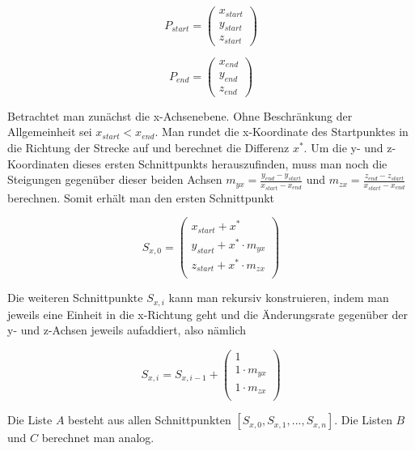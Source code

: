 \documentclass[]{dsadokumentation}
\begin{document}
\begin{equation}
  P_{start} = \begin{pmatrix}x_{start} \\ y_{start} \\ z_{start}\end{pmatrix}
\end{equation}

\begin{equation}
  P_{end} = \begin{pmatrix}x_{end} \\ y_{end} \\ z_{end}\end{pmatrix}
\end{equation}

Betrachtet man zunächst die x-Achsenebene. Ohne Beschränkung der Allgemeinheit sei $x_{start} < x_{end}$. Man rundet die x-Koordinate des Startpunktes in die Richtung der Strecke auf und berechnet die Differenz $x^{\ast}$. Um die y- und z-Koordinaten dieses ersten Schnittpunkts herauszufinden, muss man noch die Steigungen gegenüber dieser beiden Achsen $m_{yx} = \frac{y_{end} - y_{start}}{x_{start} - x_{end}}$ und $m_{zx} = \frac{z_{end} - z_{start}}{x_{start} - x_{end}}$ berechnen. Somit erhält man den ersten Schnittpunkt

\begin{equation}
  S_{x,0} = \begin{pmatrix}
    x_{start} + x^{\ast} \\
    y_{start} + x^{\ast} \cdot m_{yx} \\
    z_{start} + x^{\ast} \cdot m_{zx} \\
  \end{pmatrix}
\end{equation}

Die weiteren Schnittpunkte $S_{x,i}$ kann man rekursiv konstruieren, indem man jeweils eine Einheit in die x-Richtung geht und die Änderungsrate gegenüber der y- und z-Achsen jeweils aufaddiert, also nämlich

\begin{equation}
  S_{x,i} = S_{x,i-1} + \begin{pmatrix}
    1 \\
    1 \cdot m_{yx} \\
    1 \cdot m_{zx} \\
  \end{pmatrix}
\end{equation}

 Die Liste $A$ besteht aus allen Schnittpunkten $[S_{x,0}, S_{x,1}, ..., S_{x,n}]$. Die Listen $B$ und $C$ berechnet man analog.
\end{document}
